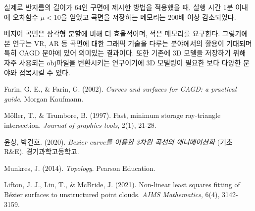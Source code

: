 \documentclass[10pt]{gshs-report-v2.0}
\theoremstyle{theorem}
\theoremstyle{lemma}
\theoremstyle{definition}
\begin{document}
실제로 반지름의 길이가 64인 구면에 제시한 방법을 적용했을 때, 실행 시간 1분 이내에 오차함수 $\mu<10$을 얻었고 곡면을 저장하는 메모리는 200배 이상 감소되었다. 

베지어 곡면은 삼각형 분할에 비해 더 효율적이며, 적은 메모리를 요구한다. 그렇기에 본 연구는 VR, AR 등 곡면에 대한 그래픽 기술을 다루는 분야에서의 활용이 기대되며 특히 CAGD 분야에 있어 의미있는 결과이다. 또한 기존에 3D 모델을 저장하기 위해 자주 사용되는 obj파일을 변환시키는 연구이기에 3D 모델링이 필요한 보다 다양한 분야와 접목시킬 수 있다. \\


\noindent{}


\begin{thebibliography}{99}
	
 Farin, G. E., \& Farin, G. (2002). \emph{Curves and surfaces for CAGD: a practical guide}. Morgan Kaufmann.

 Möller, T., \& Trumbore, B. (1997). Fast, minimum storage ray-triangle intersection. \emph{Journal of graphics tools}, 2(1), 21-28.

 윤상, 박건호. (2020). \emph{Bezier curve를 이용한 3차원 곡선의 애니메이션화} (기초 R\&E). 경기과학고등학고.

 Munkres, J. (2014). \emph{Topology}. Pearson Education.

 Lifton, J. J., Liu, T., \& McBride, J. (2021). Non-linear least squares fitting of Bézier surfaces to unstructured point clouds. \emph{AIMS Mathematics}, 6(4), 3142-3159.

\end{thebibliography}
\end{document}
